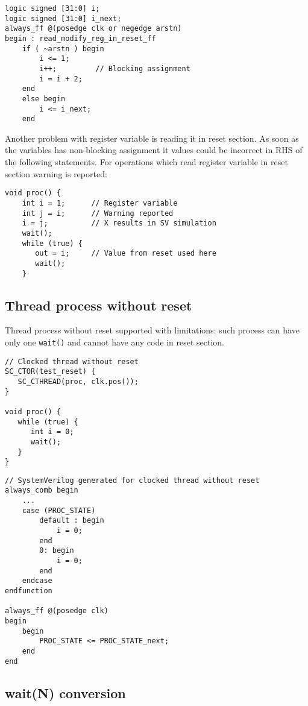 \begin{lstlisting}[style=myverilog]
logic signed [31:0] i;
logic signed [31:0] i_next;
always_ff @(posedge clk or negedge arstn) 
begin : read_modify_reg_in_reset_ff
    if ( ~arstn ) begin
        i <= 1;
        i++;         // Blocking assignment
        i = i + 2;   
    end
    else begin
        i <= i_next;
    end
\end{lstlisting}

Another problem with register variable is reading it in reset section. As soon as the variables has non-blocking assignment it values could be incorrect in RHS of the following statements. For operations which read register variable in reset section warning is reported:
%
\begin{lstlisting}[style=mycpp]
void proc() {
    int i = 1;      // Register variable
    int j = i;      // Warning reported
    i = j;          // X results in SV simulation
    wait();
    while (true) {
       out = i;     // Value from reset used here
       wait();
    }        
\end{lstlisting}

\subsection{Thread process without reset}\label{section:noreset}

Thread process without reset supported with limitations: such process can have only one {\tt wait()} and cannot have any code in reset section.

\begin{lstlisting}[style=mycpp]
// Clocked thread without reset
SC_CTOR(test_reset) {
   SC_CTHREAD(proc, clk.pos());
}

void proc() {
   while (true) {
      int i = 0;
      wait();
   }
}
\end{lstlisting}
%
\begin{lstlisting}[style=myverilog]
// SystemVerilog generated for clocked thread without reset
always_comb begin 
    ...
    case (PROC_STATE)
        default : begin
            i = 0;
        end
        0: begin
            i = 0;
        end
    endcase
endfunction

always_ff @(posedge clk) 
begin 
    begin
        PROC_STATE <= PROC_STATE_next;
    end
end
\end{lstlisting}

\subsection{wait(N) conversion}\label{section:waitn_gen}

